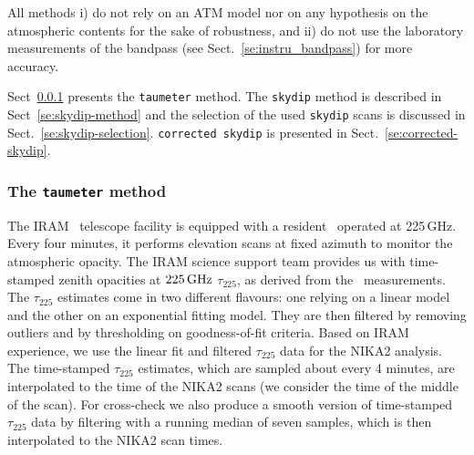 All methods i) do not rely on an ATM model nor on any
hypothesis on the atmospheric contents for the sake of robustness, and
ii) do not use the laboratory measurements of the bandpass (see 
Sect.~\ref{se:instru_bandpass}) for more accuracy.  

Sect~\ref{se:taumeter-method} presents the {\tt taumeter} method. The 
{\tt skydip} method is described in Sect~\ref{se:skydip-method} and
the selection of the used {\tt skydip} scans is discussed in
Sect.~\ref{se:skydip-selection}.
{\tt corrected skydip} is presented in Sect.~\ref{se:corrected-skydip}.

\subsubsection{The {\tt taumeter} method}
\label{se:taumeter-method}

The IRAM \trentemetre\ telescope facility is equipped with a
resident \taumeter\ operated at 225\,GHz. Every four
minutes, it performs elevation scans at fixed azimuth
to monitor the atmospheric opacity.
The IRAM science support
team provides us with time-stamped zenith opacities at $225\,\rm{GHz}$
$\tau_{225}$, as derived from the \taumeter\ measurements. The
$\tau_{225}$ estimates come in two different flavours: one relying
on a linear model and the other on an exponential fitting model. They
are then filtered by removing outliers and by thresholding on
goodness-of-fit criteria.
Based on IRAM experience, we use the linear fit and filtered $\tau_{225}$
data for the NIKA2 analysis. The time-stamped $\tau_{225}$ estimates,
which are sampled about every 4 minutes, are interpolated to the time
of the NIKA2 scans (we consider the time of the middle of the
scan). For cross-check we also produce a smooth version of time-stamped
$\tau_{225}$ data by
filtering with a running median of seven samples, which is then
interpolated to the NIKA2 scan times.

